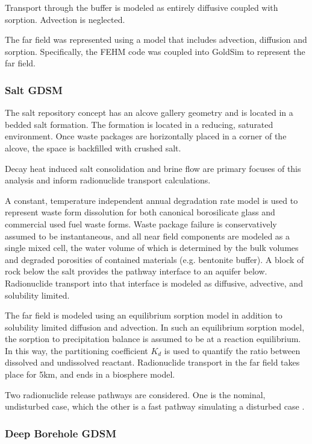 Transport through the buffer is modeled as entirely diffusive coupled with 
sorption. Advection is neglected.

The far field was represented using a model that includes advection, diffusion 
and sorption. Specifically, the \gls{FEHM} code was coupled into GoldSim to 
represent the far field.

\subsubsection{Salt GDSM}

The salt repository concept has an alcove gallery geometry and is located in a 
bedded salt formation. The formation is located in a reducing, saturated 
environment. Once waste packages  are horizontally placed in a corner of the 
alcove, the space is backfilled with crushed salt. 

Decay heat induced salt consolidation and brine flow are primary focuses of 
this analysis and inform radionuclide transport calculations. 

A constant, temperature independent annual degradation rate model is used to 
represent waste form dissolution for both canonical borosilicate glass and 
commercial used fuel waste forms. Waste package failure is conservatively 
assumed to be instantaneous, and all near field components are modeled as a 
single mixed cell, the water volume of which is determined by the bulk volumes 
and degraded porosities of contained materials (e.g. bentonite buffer). A block  
of rock below the salt provides the pathway interface to an aquifer below. 
Radionuclide transport into that interface is modeled as diffusive, advective, and 
solubility limited.

The far field is modeled using an equilibrium sorption model in addition 
to solubility limited diffusion and advection. In such an equilibrium sorption 
model, the sorption to precipitation balance is assumed to be at a 
reaction equilibrium. In this way, the partitioning coefficient $K_d$ is used to 
quantify the ratio between dissolved and undissolved reactant. Radionuclide transport
in the far field takes place for 5km, and ends in a biosphere model. 

Two radionuclide release pathways are considered. One is the nominal, undisturbed 
case, which the other is a fast pathway simulating a disturbed case
\cite{clayton_generic_2011}.


\subsubsection{ Deep Borehole GDSM}

